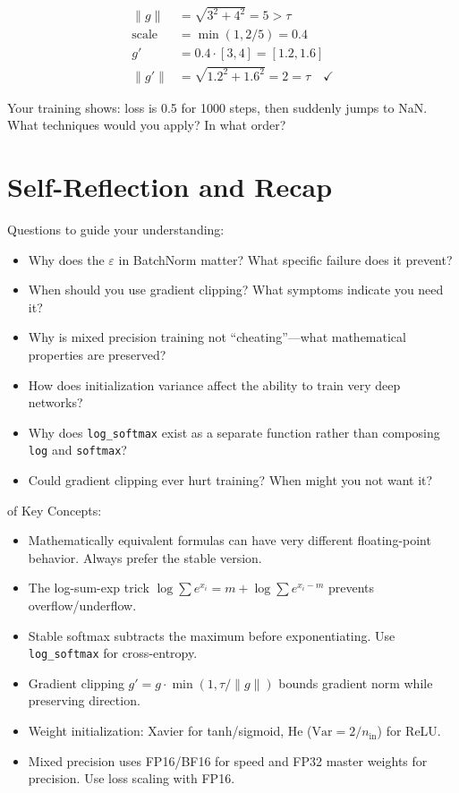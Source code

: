 \begin{align*}
    \|g\| &= \sqrt{3^2 + 4^2} = 5 > \tau \\
    \text{scale} &= \min(1, 2/5) = 0.4 \\
    g' &= 0.4 \cdot [3, 4] = [1.2, 1.6] \\
    \|g'\| &= \sqrt{1.2^2 + 1.6^2} = 2 = \tau \quad \checkmark
\end{align*}


\vspace{2em}
 Your training shows: loss is 0.5 for 1000 steps, then suddenly jumps to NaN. What techniques would you apply? In what order?




\newpage
\section{Self-Reflection and Recap}

 Questions to guide your understanding:
\begin{itemize}
    \item Why does the $\varepsilon$ in BatchNorm matter? What specific failure does it prevent?
    \item When should you use gradient clipping? What symptoms indicate you need it?
    \item Why is mixed precision training not ``cheating''---what mathematical properties are preserved?
    \item How does initialization variance affect the ability to train very deep networks?
    \item Why does \texttt{log\_softmax} exist as a separate function rather than composing \texttt{log} and \texttt{softmax}?
    \item Could gradient clipping ever hurt training? When might you not want it?
\end{itemize}


 of Key Concepts:
\begin{itemize}
    \item Mathematically equivalent formulas can have very different floating-point behavior. Always prefer the stable version.
    \item The log-sum-exp trick $\log\sum e^{x_i} = m + \log\sum e^{x_i - m}$ prevents overflow/underflow.
    \item Stable softmax subtracts the maximum before exponentiating. Use \texttt{log\_softmax} for cross-entropy.
    \item Gradient clipping $g' = g \cdot \min(1, \tau/\|g\|)$ bounds gradient norm while preserving direction.
    \item Weight initialization: Xavier for tanh/sigmoid, He ($\text{Var} = 2/n_{\text{in}}$) for ReLU.
    \item Mixed precision uses FP16/BF16 for speed and FP32 master weights for precision. Use loss scaling with FP16.
\end{itemize}


